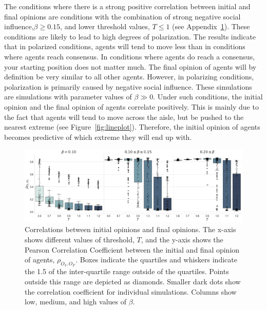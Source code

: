 \documentclass[11pt]{article}
\begin{document}
The conditions where there is a strong positive correlation between initial and final opinions are conditions with the combination of strong negative social influence,$\beta \geq 0.15$, and lower threshold values, $T \leq 1$ (see Appendix~\ref{appendix:corr_initial_final}). These conditions are likely to lead to high degrees of polarization. The results indicate that in polarized conditions, agents will tend to move less than in conditions where agents reach consensus. In conditions where agents do reach a consensus, your starting position does not matter much. The final opinion of agents will by definition be very similar to all other agents. However, in polarizing conditions, polarization is primarily caused by negative social influence. These simulations are simulations with parameter values of $\beta \gg 0$. Under such conditions, the initial opinion and the final opinion of agents correlate positively. This is mainly due to the fact that agents will tend to move across the aisle, but be pushed to the nearest extreme (see Figure~\ref{fig:lineplot}). Therefore, the initial opinion of agents becomes predictive of which extreme they will end up with. 

\begin{figure}[H]
    \centering
    \includegraphics[width=.8\linewidth]{../plots/overall/Correlation_Initial_Opinions.png}
  \caption{Correlations between initial opinions and final opinions. The x-axis shows different values of threshold, $T$, and the y-axis shows the Pearson Correlation Coefficient between the initial and final opinion of agents, $\rho_{O_I, O_F}$. Boxes indicate the quartiles and whiskers indicate the 1.5 of the inter-quartile range outside of the quartiles. Points outside this range are depicted as diamonds. Smaller dark dots show the correlation coefficient for individual simulations. Columns show low, medium, and high values of $\beta$. }
  \label{appendix:corr_initial_final}
\end{figure}
\end{document}

